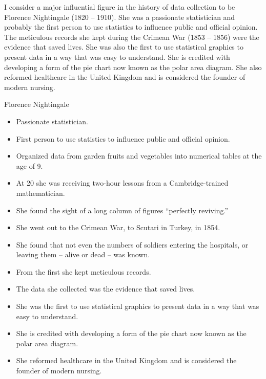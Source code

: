 I consider a major influential figure in the history of data
collection to be Florence Nightingale (1820 -- 1910).  She was a passionate statistician
and probably the first person to use statistics to influence public and official
opinion.  The meticulous records she kept during the Crimean War
(1853 -- 1856) were the evidence that saved lives.  She was also the first to use
statistical graphics to present data in a way that was easy to understand.  She is
credited with developing a form of the pie chart now known as the polar area
diagram.  She also reformed healthcare in the United Kingdom and
is considered the founder of modern nursing.

\begin{slidebox}{Florence Nightingale}{}
  \begin{itemize}
    \item Passionate statistician.
    \item First person to use statistics to influence public and official opinion.
    \item Organized data from garden fruits and vegetables into numerical tables at the age of 9.
    \item At 20 she was receiving two-hour lessons from a Cambridge-trained mathematician.
    \item She found the sight of a long column of figures ``perfectly reviving.''
    \item She went out to the Crimean War, to Scutari in Turkey, in 1854.
    \item She found that not even the numbers of soldiers entering the hospitals, or leaving them – alive or dead – was known.
    \item From the first she kept meticulous records.
    \item The data she collected was the evidence that saved lives.
    \item She was the first to use statistical graphics to present data in a way that was easy to understand.
    \item She is credited with developing a form of the pie chart now known as the polar area diagram.
    \item She reformed healthcare in the United Kingdom and is considered the founder of modern nursing.
  \end{itemize}
\end{slidebox}

